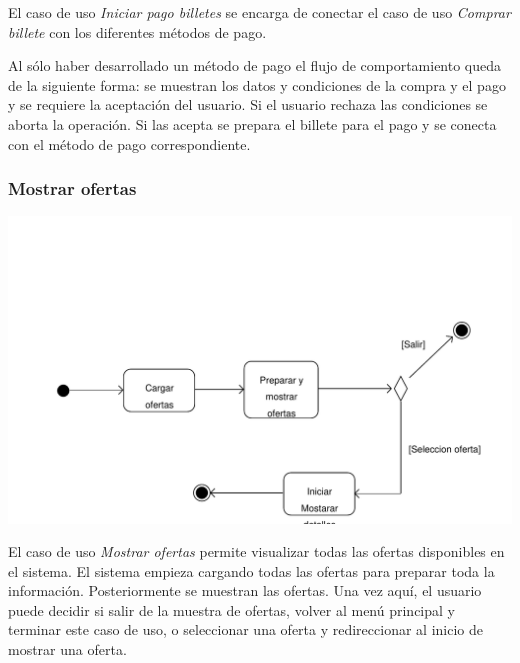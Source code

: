 \documentclass[11pt, a4paper, twoside, titlepage]{article}
\begin{document}
				El caso de uso {\itshape Iniciar pago billetes} se encarga de conectar el caso de uso {\itshape Comprar billete} con los diferentes métodos de pago.

				Al sólo haber desarrollado un método de pago el flujo de comportamiento queda de la siguiente forma: se muestran los datos y condiciones de la compra y el pago y se requiere la aceptación del usuario. Si el usuario rechaza las condiciones se aborta la operación. Si las acepta se prepara el billete para el pago y se conecta con el método de pago correspondiente.

			\subsubsection{Mostrar ofertas}
				\begin{center}
					\includegraphics[scale=.65]{analisis/diagramas/da_mostrarofertas.pdf}
				\end{center}

				El caso de uso {\itshape Mostrar ofertas} permite visualizar todas las ofertas disponibles en el sistema. 
				El sistema empieza cargando todas las ofertas para preparar toda la información. Posteriormente se muestran las ofertas. Una vez aquí, el usuario puede decidir si salir de la muestra de ofertas, volver al menú principal y terminar este caso de uso, o seleccionar una oferta y redireccionar al inicio de mostrar una oferta.
\end{document}

